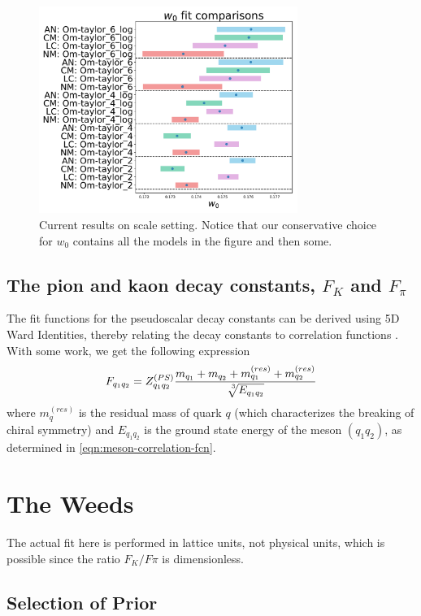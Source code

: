 \documentclass[prd,tightenlines,preprintnumbers,showpacs,superscriptaddress,notitlepage,eqsecnum,floatfix,notitlepage]{revtex4-1}
\begin{document}
\begin{figure}
	\includegraphics[width=0.75\textwidth]{./../figs/w0_comparison.pdf}
	\caption{Current results on scale setting. Notice that our conservative choice for $w_0$ contains all the models in the figure and then some.}
\end{figure}

\subsection{The pion and kaon decay constants, $F_K$ and $F_\pi$}
The fit functions for the pseudoscalar decay constants can be derived using 5D Ward Identities, thereby relating the decay constants to correlation functions \cite{Berkowitz:2017opd}. With some work, we get the following expression
\begin{equation}
F_{q_1 q_2} = Z^{(PS)}_{q_1 q_2}\frac{m_{q_1} + m_{q_2} + m^{(res)}_{q_1} + m^{(res)}_{q_2} }{\sqrt[\leftroot{-3}\uproot{3}3]{E_{q_1 q_2}}}
\end{equation}
where $m^{(res)}_q$ is the residual mass of quark $q$ (which characterizes the breaking of chiral symmetry) and $E_{q_1 q_2}$ is the ground state energy of the meson $(q_1 q_2)$, as determined in \eqref{eqn:meson-correlation-fcn}.



\section{The Weeds}
The actual fit here is performed in lattice units, not physical units, which is possible since the ratio $F_K / F\pi$ is dimensionless.

\subsection{Selection of Prior}
\end{document}
